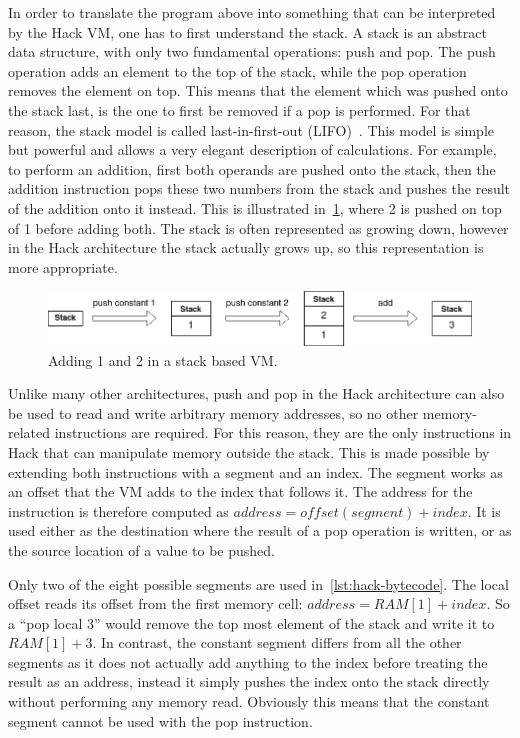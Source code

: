 In order to translate the program above into something that can be interpreted by the Hack VM, one has to first understand the stack.
A stack is an abstract data structure, with only two fundamental operations: push and pop. The push operation adds an element to the top of the stack, while the pop operation removes the element on top. This means that the element which was pushed onto the stack last, is the one to first be removed if a pop is performed. For that reason, the stack model is called last-in-first-out (LIFO)~\cite{nisan2005}.
This model is simple but powerful and allows a very elegant description of calculations.
For example, to perform an addition, first both operands are pushed onto the stack, then the addition instruction pops these two numbers from the stack and pushes the result of the addition onto it instead. This is illustrated in~\cref{fig:stack-add}, where 2 is pushed on top of 1 before adding both. The stack is often represented as growing down, however in the Hack architecture the stack actually grows up, so this representation is more appropriate.
\begin{center}
  \begin{figure}[ht]
    \centering
    \includegraphics[width=14cm]{fig/stack-add.png}
    \caption{Adding 1 and 2 in a stack based VM.}
    \label{fig:stack-add}
  \end{figure}
\end{center}

Unlike many other architectures, push and pop in the Hack architecture can also be used to read and write arbitrary memory addresses, so no other memory-related instructions are required. For this reason, they are the only instructions in Hack that can manipulate memory outside the stack.
This is made possible by extending both instructions with a segment and an index. The segment works as an offset that the VM adds to the index that follows it.
The address for the instruction is therefore computed as \(address=offset(segment)+index\).
It is used either as the destination where the result of a pop operation is written, or as the source location of a value to be pushed.

Only two of the eight possible segments are used in~\cref{lst:hack-bytecode}.
The local offset reads its offset from the first memory cell: \(address=RAM[1]+index\). So a ``pop local 3'' would remove the top most element of the stack and write it to \(RAM[1]+3\).
In contrast, the constant segment differs from all the other segments as it does not actually add anything to the index before treating the result as an address, instead it simply pushes the index onto the stack directly without performing any memory read. Obviously this means that the constant segment cannot be used with the pop instruction.

